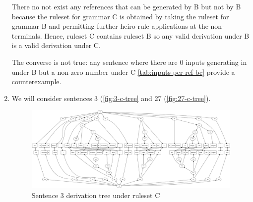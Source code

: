 \documentclass[a4paper,oneside,reqno]{amsart}
\begin{document}
\begin{enumerate}[label=\arabic*.]
    There no not exist any references that can be generated by B but
    not by B because the ruleset for grammar C is obtained by taking
    the ruleset for grammar B and permitting further heiro-rule applications
    at the non-terminals. Hence, ruleset C contains ruleset B so any valid
    derivation under B is a valid derivation under C.

    The converse is not true: any sentence where there are 0 inputs generating
    in under B but a non-zero number under C \autoref{tab:inputs-per-ref-bc}
    provide a counterexample.

  \item We will consider sentences 3 (\autoref{fig:3-c-tree} and 27 (\autoref{fig:27-c-tree}).
    \begin{figure}[h!]
      \begin{center}
        \includegraphics[scale=0.2]{../output/tree3Cdvn1.jpg}
      \end{center}
      \caption{Sentence 3 derivation tree under ruleset C}
      \label{fig:3-c-tree}
    \end{figure}
    \begin{figure}[h!]
      \begin{center}

\end{center}
\end{figure}
\end{enumerate}
\end{document}
